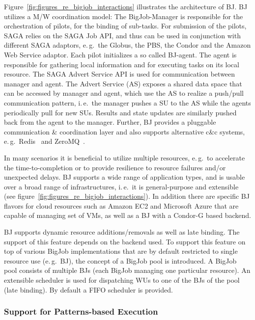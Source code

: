 \documentclass[]{svjour3}
\begin{document}
Figure~\ref{fig:figures_re_bigjob_interactions} illustrates the
architecture of BJ. BJ utilizes a M/W coordination model: The
BigJob-Manager is responsible for the orchestration of pilots, for the
binding of sub-tasks. For submission of the pilots, SAGA relies on the
SAGA Job API, and thus can be used in conjunction with different SAGA
adaptors, e.\,g.\ the Globus, the PBS, the Condor and the Amazon Web
Service adaptor. Each pilot initializes a so called BJ-agent. The
agent is responsible for gathering local information and for executing
tasks on its local resource. The SAGA Advert Service API is used for
communication between manager and agent. The Advert Service (AS)
exposes a shared data space that can be accessed by manager and agent,
which use the AS to realize a push/pull communication pattern, i.\,e.\
the manager pushes a SU to the AS while the agents periodically pull
for new SUs. Results and state updates are similarly pushed back from
the agent to the manager. Further, BJ provides a pluggable
communication \& coordination layer and also supports alternative c\&c
systems, e.\,g.\ Redis~\cite{redis} and ZeroMQ~\cite{zmq}.

In many scenarios it is beneficial to utilize multiple resources,
e.\,g.\ to accelerate the time-to-completion or to provide resilience
to resource failures and/or unexpected delays. 
BJ supports a wide range of application types, and is usable over a
broad range of infrastructures, i.\,e.\ it is general-purpose and
extensible (see figure~\ref{fig:figures_re_bigjob_interactions}). In
addition there are specific BJ flavors for cloud resources such as
Amazon EC2 and Microsoft Azure that are capable of managing set of
VMs, as well as a BJ with a Condor-G based backend.

BJ supports dynamic resource additions/removals as well as late
binding. The support of this feature depends on the backend used. To
support this feature on top of various BigJob implementations that are
by default restricted to single resource use (e.\,g.\ BJ), the concept
of a BigJob pool is introduced. A BigJob pool consists of multiple BJs
(each BigJob managing one particular resource). An extensible
scheduler is used for dispatching WUs to one of the BJs of the pool
(late binding). By default a FIFO scheduler is provided.

\subsubsection{Support for Patterns-based Execution}
\end{document}

